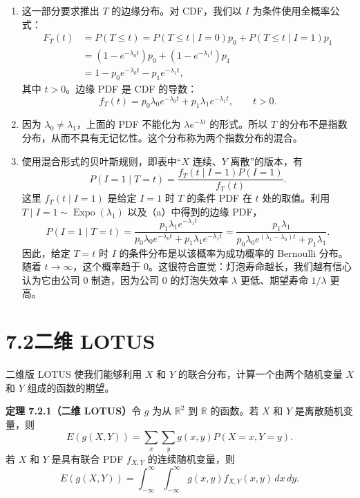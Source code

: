 \documentclass[UTF8,12pt,a4paper,fontset=fandol]{ctexart}
\begin{document}
\begin{enumerate}
  \item 这一部分要求推出 $T$ 的边缘分布。对 CDF，我们以 $I$ 为条件使用全概率公式：
  \[
  \begin{aligned}
    F_T(t)&=P(T\le t)=P(T\le t\mid I=0)p_0+P(T\le t\mid I=1)p_1\\
    &=(1-e^{-\lambda_0 t})p_0+(1-e^{-\lambda_1 t})p_1\\
    &=1-p_0e^{-\lambda_0 t}-p_1e^{-\lambda_1 t},
  \end{aligned}
  \]
  其中 $t>0$。边缘 PDF 是 CDF 的导数：
  \[
    f_T(t)=p_0\lambda_0 e^{-\lambda_0 t}+p_1\lambda_1 e^{-\lambda_1 t},\qquad t>0.
  \]

  \item 因为 $\lambda_0\ne\lambda_1$，上面的 PDF 不能化为 $\lambda e^{-\lambda t}$ 的形式。所以 $T$ 的分布不是指数分布，从而不具有无记忆性。这个分布称为两个指数分布的混合。

  \item 使用混合形式的贝叶斯规则，即表中“$X$ 连续、$Y$ 离散”的版本，有
  \[
    P(I=1\mid T=t)=\frac{f_T(t\mid I=1)P(I=1)}{f_T(t)}.
  \]
  这里 $f_T(t\mid I=1)$ 是给定 $I=1$ 时 $T$ 的条件 PDF 在 $t$ 处的取值。利用 $T\mid I=1\sim \operatorname{Expo}(\lambda_1)$ 以及（a）中得到的边缘 PDF，
  \[
    P(I=1\mid T=t)
    =\frac{p_1\lambda_1 e^{-\lambda_1 t}}
    {p_0\lambda_0 e^{-\lambda_0 t}+p_1\lambda_1 e^{-\lambda_1 t}}
    =\frac{p_1\lambda_1}{p_0\lambda_0 e^{(\lambda_1-\lambda_0)t}+p_1\lambda_1}.
  \]
  因此，给定 $T=t$ 时 $I$ 的条件分布是以该概率为成功概率的 Bernoulli 分布。随着 $t\to\infty$，这个概率趋于 $0$。这很符合直觉：灯泡寿命越长，我们越有信心认为它由公司 0 制造，因为公司 0 的灯泡失效率 $\lambda$ 更低、期望寿命 $1/\lambda$ 更高。
\end{enumerate}

\section*{7.2\quad 二维 LOTUS}

二维版 LOTUS 使我们能够利用 $X$ 和 $Y$ 的联合分布，计算一个由两个随机变量 $X$ 和 $Y$ 组成的函数的期望。

\noindent\textbf{定理 7.2.1（二维 LOTUS）}\quad 令 $g$ 为从 $\mathbb{R}^2$ 到 $\mathbb{R}$ 的函数。若 $X$ 和 $Y$ 是离散随机变量，则
\[
  E(g(X,Y))=\sum_x\sum_y g(x,y)P(X=x,Y=y).
\]
若 $X$ 和 $Y$ 是具有联合 PDF $f_{X,Y}$ 的连续随机变量，则
\[
  E(g(X,Y))=\int_{-\infty}^{\infty}\int_{-\infty}^{\infty}
  g(x,y)f_{X,Y}(x,y)\,dx\,dy.
\]
\end{document}
